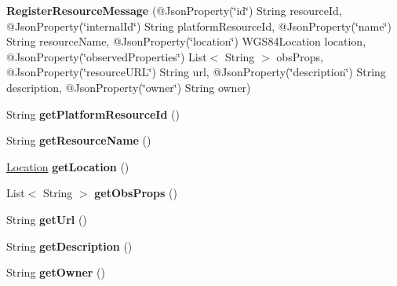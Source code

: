 \begin{DoxyCompactItemize}
\item 
\mbox{\label{classeu_1_1h2020_1_1symbiote_1_1messages_1_1RegisterResourceMessage_a86de70e076f50717664b5a1d1fcfe723}} 
{\bfseries Register\+Resource\+Message} (@Json\+Property(\char`\"{}id\char`\"{}) String resource\+Id, @Json\+Property(\char`\"{}internal\+Id\char`\"{}) String platform\+Resource\+Id, @Json\+Property(\char`\"{}name\char`\"{}) String resource\+Name, @Json\+Property(\char`\"{}location\char`\"{}) W\+G\+S84\+Location location, @Json\+Property(\char`\"{}observed\+Properties\char`\"{}) List$<$ String $>$ obs\+Props, @Json\+Property(\char`\"{}resource\+U\+RL\char`\"{}) String url, @Json\+Property(\char`\"{}description\char`\"{}) String description, @Json\+Property(\char`\"{}owner\char`\"{}) String owner)
\item 
\mbox{\label{classeu_1_1h2020_1_1symbiote_1_1messages_1_1RegisterResourceMessage_aa9aec71a421bcfdd57073d1a745ea395}} 
String {\bfseries get\+Platform\+Resource\+Id} ()
\item 
\mbox{\label{classeu_1_1h2020_1_1symbiote_1_1messages_1_1RegisterResourceMessage_a26a678b36a08d9b5ac2e8b8ec72b699f}} 
String {\bfseries get\+Resource\+Name} ()
\item 
\mbox{\label{classeu_1_1h2020_1_1symbiote_1_1messages_1_1RegisterResourceMessage_ad37d3a7bb987da2a0bbec1db66e6c2db}} 
\hyperlink{classeu_1_1h2020_1_1symbiote_1_1model_1_1data_1_1Location}{Location} {\bfseries get\+Location} ()
\item 
\mbox{\label{classeu_1_1h2020_1_1symbiote_1_1messages_1_1RegisterResourceMessage_a1282709f43f4840183782c3999bd7ab0}} 
List$<$ String $>$ {\bfseries get\+Obs\+Props} ()
\item 
\mbox{\label{classeu_1_1h2020_1_1symbiote_1_1messages_1_1RegisterResourceMessage_a8af28840a006aa72067b34f7f7cfb4a7}} 
String {\bfseries get\+Url} ()
\item 
\mbox{\label{classeu_1_1h2020_1_1symbiote_1_1messages_1_1RegisterResourceMessage_aa03b2a90e8272cb16d99f462b66541d8}} 
String {\bfseries get\+Description} ()
\item 
\mbox{\label{classeu_1_1h2020_1_1symbiote_1_1messages_1_1RegisterResourceMessage_ab316ace0ce3cedd68f1ee54d1a1acc22}} 
String {\bfseries get\+Owner} ()
\end{DoxyCompactItemize}


